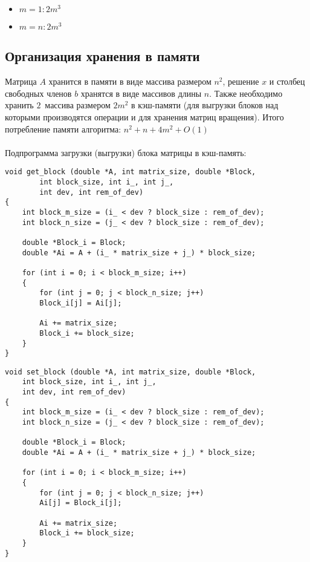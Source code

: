 \documentclass[a4paper, fontsize=14pt]{article}
\begin{document}
		\begin{itemize}
			\item $m = 1: 2m^3$
			\item $m = n: 2m^3$
		\end{itemize}
		\subsection{Организация хранения в памяти}
		Матрица $A$ хранится в памяти в виде массива размером $n^2$, решение $x$ и столбец свободных членов $b$ хранятся в виде массивов длины $n$. Также необходимо хранить $2\,$ массива размером $2m^2$ в кэш-памяти (для выгрузки блоков над которыми производятся операции и для хранения матриц вращения). Итого потребление памяти алгоритма: $n^2 + n + 4m^2 + O(1)$
		\\
		\\Подпрограмма загрузки (выгрузки) блока матрицы в кэш-память:
		\begin{lstlisting}
void get_block (double *A, int matrix_size, double *Block,
		int block_size, int i_, int j_,
		int dev, int rem_of_dev)
{
	int block_m_size = (i_ < dev ? block_size : rem_of_dev);
	int block_n_size = (j_ < dev ? block_size : rem_of_dev);
	
	double *Block_i = Block;
	double *Ai = A + (i_ * matrix_size + j_) * block_size;
	
	for (int i = 0; i < block_m_size; i++)
	{
		for (int j = 0; j < block_n_size; j++)
		Block_i[j] = Ai[j];
		
		Ai += matrix_size;
		Block_i += block_size;
	}
}
		\end{lstlisting}

		\begin{lstlisting}
void set_block (double *A, int matrix_size, double *Block,
	int block_size, int i_, int j_,
	int dev, int rem_of_dev)
{
	int block_m_size = (i_ < dev ? block_size : rem_of_dev);
	int block_n_size = (j_ < dev ? block_size : rem_of_dev);
	
	double *Block_i = Block;
	double *Ai = A + (i_ * matrix_size + j_) * block_size;
	
	for (int i = 0; i < block_m_size; i++)
	{
		for (int j = 0; j < block_n_size; j++)
		Ai[j] = Block_i[j];
		
		Ai += matrix_size;
		Block_i += block_size;
	}
}
		\end{lstlisting}
		
\end{document}
